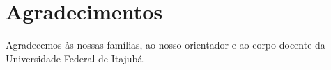 \section*{Agradecimentos}

Agradecemos às nossas famílias, ao nosso orientador e ao corpo docente da Universidade Federal de Itajubá.
